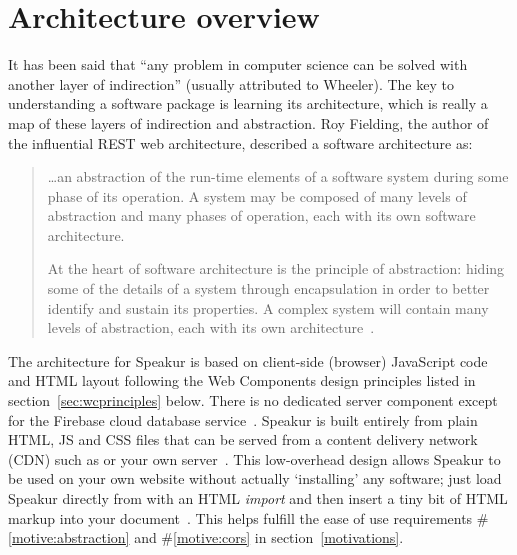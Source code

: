 \section{Architecture overview}
It has been said that ``any problem in computer science can be solved with another layer of indirection'' (usually attributed to Wheeler).
The key to understanding a software package is learning its architecture,
which is really a map of these layers of indirection and abstraction.
Roy Fielding, the author of the influential REST web architecture, described a software architecture as:

\begin{quote}
\dots an abstraction of the run-time elements of a software system during some phase of its operation. A system may be composed of many levels of abstraction and many phases of operation, each with its own software architecture.

At the heart of software architecture is the principle of abstraction: hiding some of the details of a system through encapsulation in order to better identify and sustain its properties. A complex system will contain many levels of abstraction, each with its own architecture~\cite{fielding2000}.
\end{quote}

The architecture for Speakur is based on client-side (browser) JavaScript code and HTML layout following the Web Components design principles listed in section~\ref{sec:wcprinciples} below. 
There is no dedicated server component except for the Firebase cloud database service~\cite{firebasecontributors2015}.
Speakur is built entirely from plain HTML, JS and CSS files that can be served from a content delivery network (CDN) 
such as  or your own server~\cite{landers2015-d}.
This low-overhead design allows Speakur to be used on your own website without actually `installing' any software;
just load Speakur directly from  with an HTML \textit{import}
and then insert a tiny bit of HTML markup into your document~\cite{landers2015-d}.
This helps fulfill the ease of use requirements 
\#\ref{motive:abstraction} and \#\ref{motive:cors}
in section~\ref{motivations}.

